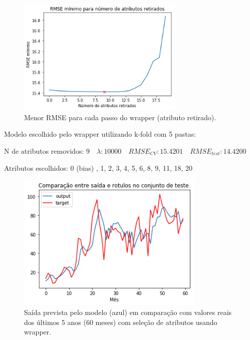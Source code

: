\documentclass[a4paper, 12pt]{article}
\begin{document}
\begin{figure}[h!]
    \centering
    \includegraphics[width=8cm]{images/backward.png}
    \caption{Menor RMSE para cada passo do wrapper (atributo retirado).}
\end{figure}

Modelo escolhido pelo wrapper utilizando k-fold com 5 pastas:

N de atributos removidos: $9 \quad \lambda: 10000 \quad RMSE_{CV}: 15.4201 \quad RMSE_{test}: 14.4200$

Atributos escolhidos: 0 (bias) , 1, 2, 3, 4, 5, 6, 8, 9, 11, 18, 20

\begin{figure}[h!]
    \centering
    \includegraphics[width=9cm]{images/wrapper.png}
    \caption{Saída prevista pelo modelo (azul) em comparação com valores reais dos últimos 5 anos (60 meses) com seleção de atributos usando wrapper.}
\end{figure}
\end{document}
